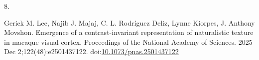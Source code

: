 \documentclass[
  10pt,
  letterpaper,
  DIV=11,
  numbers=noendperiod]{scrartcl}
\newlength{\cslhangindent}
\newlength{\csllabelwidth}
\newenvironment{CSLReferences}[2] %
 {\begin{list}{}{%
  \setlength{\itemindent}{0pt}
  \setlength{\leftmargin}{0pt}
  \setlength{\parsep}{0pt}
  \ifodd #1
   \setlength{\leftmargin}{\cslhangindent}
   \setlength{\itemindent}{-1\cslhangindent}
  \fi
  \setlength{\itemsep}{#2\baselineskip}}}
 {\end{list}}
\newcommand{\CSLLeftMargin}[1]{\parbox[t]{\csllabelwidth}{\strut#1\strut}}
\newcommand{\CSLRightInline}[1]{\parbox[t]{\linewidth - \csllabelwidth}{\strut#1\strut}}
\begin{document}
\begin{CSLReferences}{0}{1}
\CSLLeftMargin{8. }%
\CSLRightInline{Gerick M. Lee, Najib J. Majaj, C. L. Rodríguez Deliz,
Lynne Kiorpes, J. Anthony Movshon. Emergence of a contrast-invariant
representation of naturalistic texture in macaque visual cortex.
Proceedings of the National Academy of Sciences. 2025 Dec
2;122(48):e2501437122.
doi:\href{https://doi.org/10.1073/pnas.2501437122}{10.1073/pnas.2501437122}}

\end{CSLReferences}
\end{document}
